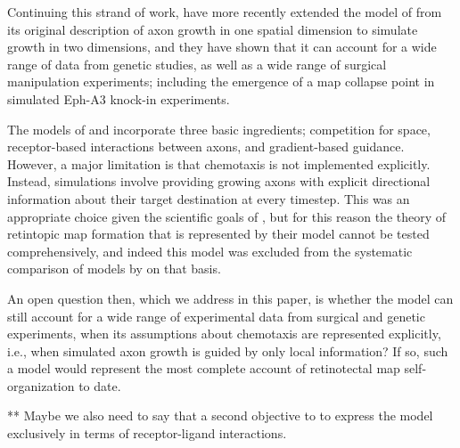 \documentclass[9pt]{elife} %
\begin{document}
Continuing this strand of work, \cite{Simpson2011} have more recently extended the model of \cite{Overton1982} from its original description of axon growth in one spatial dimension to simulate growth in two dimensions, and they have shown that it can account for a wide range of data from genetic studies, as well as a wide range of surgical manipulation experiments; including the emergence of a map collapse point in simulated Eph-A3 knock-in experiments.

The models of \cite{Overton1982} and \cite{Simpson2011} incorporate three basic ingredients; competition for space, receptor-based interactions between axons, and gradient-based guidance. However, a major limitation is that chemotaxis is not implemented explicitly. Instead, simulations involve providing growing axons with explicit directional information about their target destination at every timestep. This was an appropriate choice given the scientific goals of \cite{Simpson2011}, but for this reason the theory of retintopic map formation that is represented by their model cannot be tested comprehensively, and indeed this model was excluded from the systematic comparison of models by \cite{Hjorth2015} on that basis.

An open question then, which we address in this paper, is whether the \cite{Simpson2011} model can still account for a wide range of experimental data from surgical and genetic experiments, when its assumptions about chemotaxis are represented explicitly, i.e., when simulated axon growth is guided by only local information? If so, such a model would represent the most complete account of retinotectal map self-organization to date.

** Maybe we also need to say that a second objective to to express the model
exclusively in terms of receptor-ligand interactions.



\end{document}
